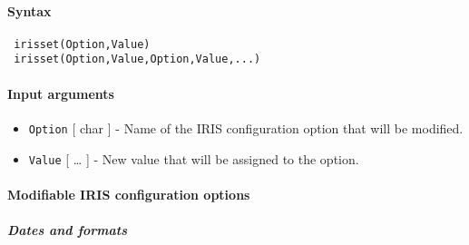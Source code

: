 


	\paragraph{Syntax}
 
 \begin{verbatim}
 irisset(Option,Value)
 irisset(Option,Value,Option,Value,...)
 \end{verbatim}
 
 \paragraph{Input arguments}
 
 \begin{itemize}
 \item
   \texttt{Option} {[} char {]} - Name of the IRIS configuration option
   that will be modified.
 \item
   \texttt{Value} {[} \ldots{} {]} - New value that will be assigned to
   the option.
 \end{itemize}
 
 \paragraph{Modifiable IRIS configuration options}
 
 \subparagraph{Dates and formats}
 
